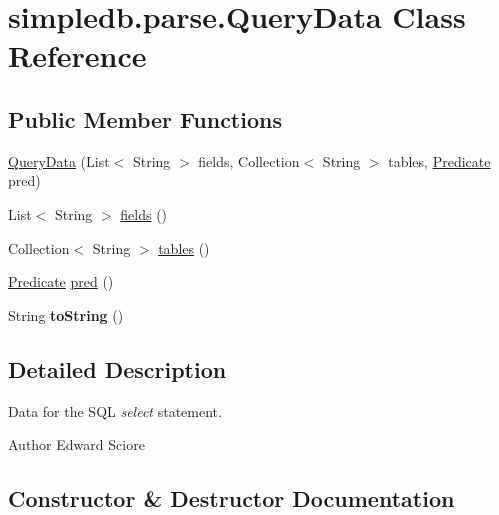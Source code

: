 \hypertarget{classsimpledb_1_1parse_1_1QueryData}{}\section{simpledb.\+parse.\+Query\+Data Class Reference}
\label{classsimpledb_1_1parse_1_1QueryData}
\subsection*{Public Member Functions}
\begin{DoxyCompactItemize}
\item 
\hyperlink{classsimpledb_1_1parse_1_1QueryData_a6d0ee71b2b7bdd9637952d22599d8e6b}{Query\+Data} (List$<$ String $>$ fields, Collection$<$ String $>$ tables, \hyperlink{classsimpledb_1_1query_1_1Predicate}{Predicate} pred)
\item 
List$<$ String $>$ \hyperlink{classsimpledb_1_1parse_1_1QueryData_a3fc0b39d3ac9755593a5b79c55654279}{fields} ()
\item 
Collection$<$ String $>$ \hyperlink{classsimpledb_1_1parse_1_1QueryData_a3faec3eb9571200bc9c6153ef1e43992}{tables} ()
\item 
\hyperlink{classsimpledb_1_1query_1_1Predicate}{Predicate} \hyperlink{classsimpledb_1_1parse_1_1QueryData_ab53d5837aa506003cebefd3cfc7bfe79}{pred} ()
\item 
\mbox{\label{classsimpledb_1_1parse_1_1QueryData_a096ff63b369be9fe9aa2a2e3823e5ab3}} 
String {\bfseries to\+String} ()
\end{DoxyCompactItemize}


\subsection{Detailed Description}
Data for the S\+QL {\itshape select} statement. \begin{DoxyAuthor}{Author}
Edward Sciore 
\end{DoxyAuthor}


\subsection{Constructor \& Destructor Documentation}
\mbox{\label{classsimpledb_1_1parse_1_1QueryData_a6d0ee71b2b7bdd9637952d22599d8e6b}} 
